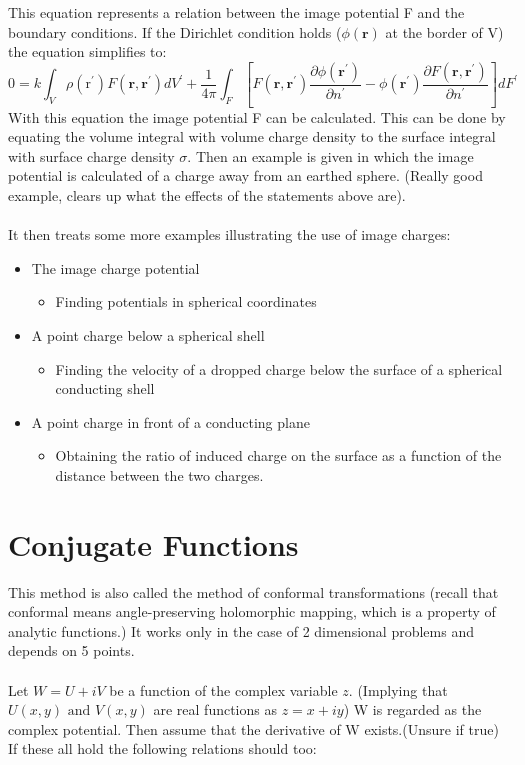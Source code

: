 This equation represents a relation between the image potential F and the boundary conditions.
If the Dirichlet condition holds ($\phi(\textbf{r})$ at the border of V) the equation simplifies to:
\begin{equation}
    0=k \int_{V} \rho\left(\mathrm{r}^{\prime}\right) F\left(\mathbf{r}, \mathbf{r}^{\prime}\right) d V^{\prime}+\frac{1}{4 \pi} \int_{F}\left[F\left(\mathbf{r}, \mathbf{r}^{\prime}\right) \frac{\partial \phi\left(\mathbf{r}^{\prime}\right)}{\partial n^{\prime}}-\phi\left(\mathbf{r}^{\prime}\right) \frac{\partial F\left(\mathbf{r}, \mathbf{r}^{\prime}\right)}{\partial n^{\prime}}\right] d F^{\prime}
    \end{equation}
With this equation the image potential F can be calculated. This can be done by equating the volume integral with volume charge density to the 
surface integral with surface charge density $\sigma$.
Then an example is given in which the image potential is calculated of a charge away from an earthed sphere.
(Really good example, clears up what the effects of the statements above are).\\
\\
\noindent It then treats some more examples illustrating the use of image charges:

\begin{itemize}
    \item The image charge potential
    \begin{itemize}
        \item Finding potentials in spherical coordinates 
    \end{itemize}
    \item A point charge below a spherical shell
    \begin{itemize}
        \item Finding the velocity of a dropped charge below the surface of a spherical conducting shell
    \end{itemize}
    \item A point charge in front of a conducting plane
    \begin{itemize}
        \item Obtaining the ratio of induced charge on the surface as a function of the distance between the two charges.
    \end{itemize}
\end{itemize}


\section{Conjugate Functions}
This method is also called the method of conformal transformations (recall that conformal means angle-preserving holomorphic mapping, which is a property of analytic functions.)
It works only in the case of 2 dimensional problems and depends on 5 points.\\
\\
\noindent Let $W = U + iV$ be a function of the complex variable $z$. (Implying that $U(x,y) \text{ and } V(x,y)$ are real functions as $z = x + iy$)
W is regarded as the complex potential. Then assume that the derivative of W exists.(Unsure if true)
If these all hold the following relations should too:

